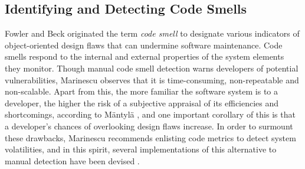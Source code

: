 \subsection{Identifying and Detecting Code Smells}
Fowler and Beck \cite{fowler1999refactoring} originated the term \textit{code smell} to designate various indicators of object-oriented design flaws that can undermine software maintenance. Code smells respond to the internal and external properties of the system elements they monitor. Though manual code smell detection warns developers of potential vulnerabilities, Marinescu \cite{Marinescu_ICETOOLS} observes that it is time-consuming, non-repeatable and non-scalable. Apart from this, the more familiar the software system is to a developer, the higher the risk of a subjective appraisal of its efficiencies and shortcomings, according to Mäntylä \cite{mantyla2003taxonomy, mantyla2004bad}, and one important corollary of this is that a developer's chances of overlooking design flaws increase. In order to surmount these drawbacks, Marinescu recommends enlisting code metrics to detect system volatilities, and in this spirit, several implementations of this alternative to manual detection have been devised \cite{lanza2007object, marinescu2004detection, Marinescu_PhD, Marinescu_IBM_JRD}.

